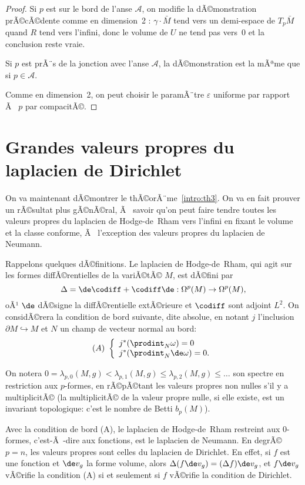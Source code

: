 \documentclass[11pt,a4paper]{smfart}
\begin{document}
\begin{proof}
Si $p$ est sur le bord de l'anse $\mathcal A$, on modifie la dÃ©monstration
prÃ©cÃ©dente comme en dimension~2 : $\gamma\cdot\bar M$ tend vers un
demi-espace de $T_p\bar M$ quand $R$ tend vers l'infini, donc le volume de
$U$ ne tend pas vers~0 et la conclusion reste vraie.

Si $p$ est prÃ¨s de la jonction avec l'anse $\mathcal A$,
la dÃ©monstration est la mÃªme que si $p\in\mathcal A$.

 Comme en dimension~2,
on peut choisir le paramÃ¨tre $\varepsilon$ uniforme par rapport Ã  $p$ par
compacitÃ©.
\end{proof}

\section{Grandes valeurs propres du laplacien de Dirichlet}
On va maintenant dÃ©montrer le thÃ©orÃ¨me~\ref{intro:th3}. On va en fait
prouver un rÃ©sultat plus gÃ©nÃ©ral, Ã  savoir qu'on peut faire 
tendre toutes les valeurs propres du laplacien de Hodge-de~Rham vers
l'infini en fixant le volume et la classe conforme, Ã  l'exception
des valeurs propres du laplacien de Neumann.

Rappelons quelques dÃ©finitions. Le laplacien de Hodge-de~Rham, qui 
agit sur les formes diffÃ©rentielles de la variÃ©tÃ© $M$, est dÃ©fini par
\begin{equation} 
\Delta=\de\codiff+\codiff\de:\Omega^p(M)\to\Omega^p(M),
\end{equation}
oÃ¹ $\de$ dÃ©signe la diffÃ©rentielle extÃ©rieure et $\codiff$ sont 
adjoint $L^2$.  On considÃ©rera la condition de bord suivante, dite absolue, 
en notant $j$ l'inclusion $\partial M\hookrightarrow M$ et $N$ un champ
de vecteur normal au bord: 
\begin{equation}
(A)\ \left\{\begin{array}{l}j^*(\prodint_N\omega)=0\\
j^*(\prodint_N\de\omega)=0.\end{array}\right.
\end{equation}

On notera $0=\lambda_{p,0}(M,g)<\lambda_{p,1}(M,g)
\leq\lambda_{p,2}(M,g)\leq\ldots$ son spectre en restriction aux $p$-formes,
en rÃ©pÃ©tant les valeurs propres non nulles s'il y a multiplicitÃ© 
(la multiplicitÃ© de la valeur propre nulle, si elle existe, est un 
invariant topologique: c'est le nombre de Betti $b_p(M)$).

Avec la condition de bord (A), le laplacien de Hodge-de~Rham restreint
aux $0$-formes, c'est-Ã -dire aux fonctions, est le laplacien de Neumann.
En degrÃ© $p=n$, les valeurs propres sont celles du laplacien de Dirichlet.
En effet, si $f$ est une fonction et $\de v_g$ la forme volume, alors
$\Delta(f\de v_g)=(\Delta f)\de v_g$, et $f\de v_g$ vÃ©rifie la condition
(A) si et seulement si $f$ vÃ©rifie la condition de Dirichlet.
\end{document}
